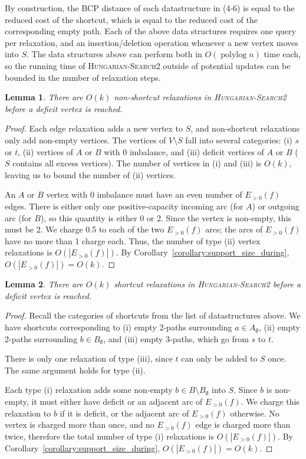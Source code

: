 \documentclass[11pt]{article}
\def\polylog{\mathop{\mathrm{polylog}}}
\theoremstyle{plain}
\newtheorem{lemma}{Lemma}[section]
\numberwithin{figure}{section}
\begin{document}
By construction, the BCP distance of each datastructure in (4-6) is equal to
the reduced cost of the shortcut, which is equal to the reduced cost of the
corresponding empty path.
Each of the above data structures requires one query per relaxation, and an
insertion/deletion operation whenever a new vertex moves into $S$.
The data structures above can perform both in $O(\polylog n)$ time each, so the
running time of \textsc{Hungarian-Search2} outside of potential updates can be
bounded in the number of relaxation steps.

\begin{lemma}
\label{lemma:goldberg_hs_length1}
There are $O(k)$ non-shortcut relaxations in \textsc{Hungarian-Search2} before
a deficit vertex is reached.
\end{lemma}

\begin{proof}
Each edge relaxation adds a new vertex to $S$, and non-shortcut relaxations
only add non-empty vertices.
The vertices of $V \setminus S$ fall into several categories:
(i) $s$ or $t$, (ii) vertices of $A$ or $B$ with 0 imbalance, and (iii)
deficit vertices of $A$ or $B$ ($S$ contains all excess vertices).
The number of vertices in (i) and (iii) is $O(k)$, leaving us to bound the
number of (ii) vertices.

An $A$ or $B$ vertex with 0 imbalance must have an even number of $E_{>0}(f)$
edges.
There is either only one positive-capacity incoming arc (for $A$) or outgoing
arc (for $B$), so this quantity is either 0 or 2.
Since the vertex is non-empty, this must be 2.
We charge 0.5 to each of the two $E_{>0}(f)$ arcs; the arcs of $E_{>0}(f)$
have no more than 1 charge each.
Thus, the number of type (ii) vertex relaxations is $O(|E_{>0}(f)|)$.
By Corollary~\ref{corollary:support_size_during}, $O(|E_{>0}(f)|) = O(k)$.
\end{proof}

\begin{lemma}
\label{lemma:goldberg_hs_length2}
There are $O(k)$ shortcut relaxations in \textsc{Hungarian-Search2} before a
deficit vertex is reached.
\end{lemma}

\begin{proof}
Recall the categories of shortcuts from the list of datastructures above.
We have shortcuts corresponding to (i) empty 2-paths surrounding
$a \in A_\emptyset$, (ii) empty 2-paths surrounding $b \in B_\emptyset$, and
(iii) empty 3-paths, which go from $s$ to $t$.

There is only one relaxation of type (iii), since $t$ can only be added to $S$
once.
The same argument holds for type (ii).

Each type (i) relaxation adds some non-empty $b \in B \setminus B_\emptyset$
into $S$.
Since $b$ is non-empty, it must either have deficit or an adjacent arc of
$E_{>0}(f)$.
We charge this relaxation to $b$ if it is deficit, or the adjacent arc of
$E_{>0}(f)$ otherwise.
No vertex is charged more than once, and no $E_{>0}(f)$ edge is charged more
than twice, therefore the total number of type (i) relaxations is
$O(|E_{>0}(f)|)$.
By Corollary~\ref{corollary:support_size_during}, $O(|E_{>0}(f)|) = O(k)$.
\end{proof}
\end{document}
